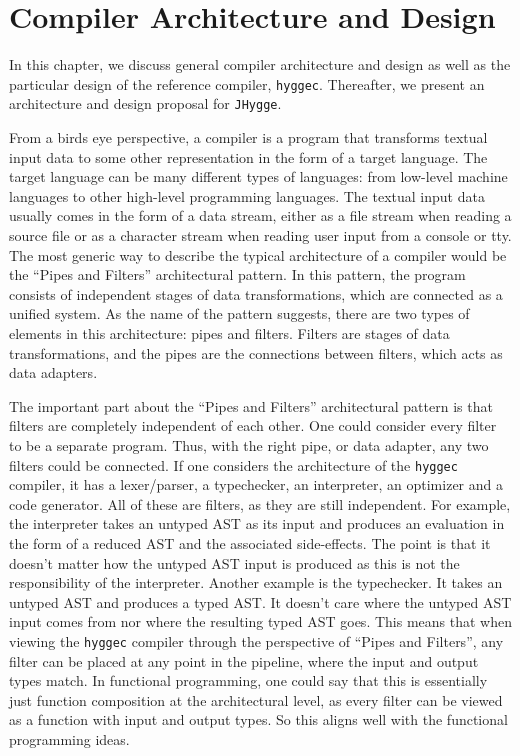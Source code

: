 \chapter{Compiler Architecture and Design}

In this chapter, we discuss general compiler architecture and design as well as the particular design of the reference compiler, \texttt{hyggec}.
Thereafter, we present an architecture and design proposal for \texttt{JHygge}.

From a birds eye perspective, a compiler is a program that transforms textual input data to some other representation in the form of a target language.
The target language can be many different types of languages: from low-level machine languages to other high-level programming languages.
The textual input data usually comes in the form of a data stream, either as a file stream when reading a source file or as a character stream when
reading user input from a console or tty. The most generic way to describe the typical architecture of a compiler would be the ``Pipes and Filters''
architectural pattern. In this pattern, the program consists of independent stages of data transformations, which are connected as a unified system.
As the name of the pattern suggests, there are two types of elements in this architecture: pipes and filters. Filters are stages of data transformations,
and the pipes are the connections between filters, which acts as data adapters.

The important part about the ``Pipes and Filters'' architectural pattern is that filters are completely independent of each other. One could consider
every filter to be a separate program. Thus, with the right pipe, or data adapter, any two filters could be connected. If one considers the architecture
of the \texttt{hyggec} compiler, it has a lexer/parser, a typechecker, an interpreter, an optimizer and a code generator. All of these are filters,
as they are still independent. For example, the interpreter takes an untyped AST as its input and produces an evaluation in the form of a reduced AST
and the associated side-effects. The point is that it doesn't matter how the untyped AST input is produced as this is not the responsibility of the
interpreter. Another example is the typechecker. It takes an untyped AST and produces a typed AST. It doesn't care where the untyped AST input comes
from nor where the resulting typed AST goes. This means that when viewing the \texttt{hyggec} compiler through the perspective of ``Pipes and Filters'',
any filter can be placed at any point in the pipeline, where the input and output types match. In functional programming, one could say that this is
essentially just function composition at the architectural level, as every filter can be viewed as a function with input and output types.
So this aligns well with the functional programming ideas.

